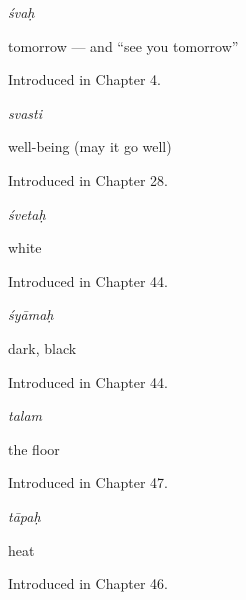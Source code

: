 \noindent\begin{minipage}[t]{\linewidth}
\raggedright
\textbf{}\enspace\emph{śvaḥ}\par
\small tomorrow — and \textquotedblleft{}see you tomorrow\textquotedblright{}\par
\footnotesize Introduced in Chapter 4.
\end{minipage}\par\medskip

\noindent\begin{minipage}[t]{\linewidth}
\raggedright
\textbf{}\enspace\emph{svasti}\par
\small well-being (may it go well)\par
\footnotesize Introduced in Chapter 28.
\end{minipage}\par\medskip

\noindent\begin{minipage}[t]{\linewidth}
\raggedright
\textbf{}\enspace\emph{śvetaḥ}\par
\small white\par
\footnotesize Introduced in Chapter 44.
\end{minipage}\par\medskip

\noindent\begin{minipage}[t]{\linewidth}
\raggedright
\textbf{}\enspace\emph{śyāmaḥ}\par
\small dark, black\par
\footnotesize Introduced in Chapter 44.
\end{minipage}\par\medskip

\noindent\begin{minipage}[t]{\linewidth}
\raggedright
\textbf{}\enspace\emph{talam}\par
\small the floor\par
\footnotesize Introduced in Chapter 47.
\end{minipage}\par\medskip

\noindent\begin{minipage}[t]{\linewidth}
\raggedright
\textbf{}\enspace\emph{tāpaḥ}\par
\small heat\par
\footnotesize Introduced in Chapter 46.
\end{minipage}\par\medskip

